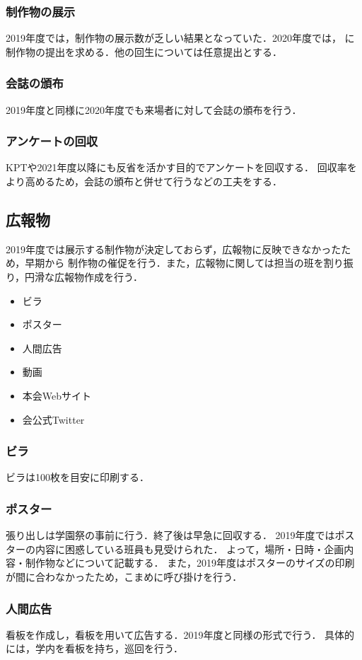\subsubsection*{制作物の展示}
2019年度では，制作物の展示数が乏しい結果となっていた．2020年度では，\secondGrade{}
に制作物の提出を求める．他の回生については任意提出とする．

\subsubsection*{会誌の頒布}
2019年度と同様に2020年度でも来場者に対して会誌の頒布を行う．

\subsubsection*{アンケートの回収}
KPTや2021年度以降にも反省を活かす目的でアンケートを回収する．
回収率をより高めるため，会誌の頒布と併せて行うなどの工夫をする．

\subsection*{広報物}
2019年度では展示する制作物が決定しておらず，広報物に反映できなかったため，早期から
制作物の催促を行う．また，広報物に関しては担当の班を割り振り，円滑な広報物作成を行う．
\begin{itemize}
    \item ビラ
    \item ポスター
    \item 人間広告
    \item 動画
    \item 本会Webサイト
    \item 会公式Twitter
\end{itemize}
\subsubsection*{ビラ}
ビラは100枚を目安に印刷する．

\subsubsection*{ポスター}
張り出しは学園祭の事前に行う．終了後は早急に回収する．
2019年度ではポスターの内容に困惑している班員も見受けられた．
よって，場所・日時・企画内容・制作物などについて記載する．
また，2019年度はポスターのサイズの印刷が間に合わなかったため，こまめに呼び掛けを行う．

\subsubsection*{人間広告}
看板を作成し，看板を用いて広告する．2019年度と同様の形式で行う．
具体的には，学内を看板を持ち，巡回を行う．

